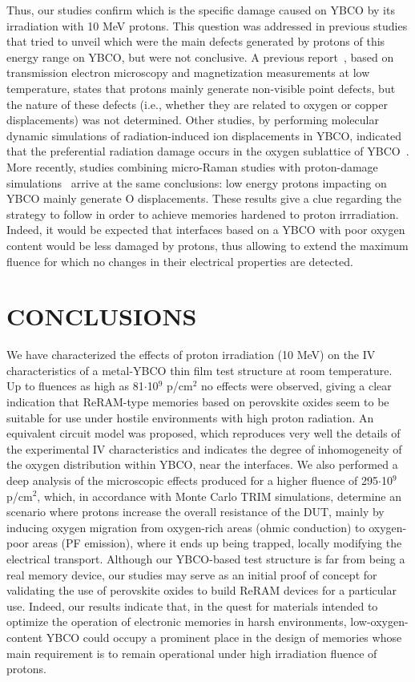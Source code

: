 \documentclass[square,aip,preprint,showkeys,superscriptaddress]{revtex4}
\begin{document}
Thus, our studies confirm which is the specific damage caused on YBCO by its irradiation with 10 MeV protons. This question was addressed in previous studies that tried to unveil which were the main defects generated by protons of this energy range on YBCO, but were not conclusive. A previous report~\cite{Kirk93}, based on transmission electron microscopy and magnetization measurements at low temperature, states that protons mainly generate non-visible point defects, but the nature of these defects (i.e., whether they are related to oxygen or copper displacements) was not determined. Other studies, by performing molecular dynamic simulations of radiation-induced ion displacements in YBCO, indicated that the preferential radiation damage occurs in the oxygen sublattice of YBCO~\cite{Cui92}. More recently, studies combining micro-Raman studies with proton-damage simulations~\cite{Li19} arrive at the same conclusions: low energy protons impacting on YBCO mainly generate O displacements. These results give a clue regarding the strategy to follow in order to achieve memories hardened to proton irrradiation. Indeed, it would be expected that interfaces based on a YBCO with poor oxygen content would be less damaged by protons, thus allowing to extend the maximum fluence for which no changes in their electrical properties are detected.



\section{CONCLUSIONS}
We have characterized the effects of proton irradiation (10 MeV) on the IV characteristics of
a metal-YBCO thin film test structure at room temperature. Up to fluences as high as 81$\cdot$10$^9$ p/cm$^2$ no effects were observed, giving a clear indication that ReRAM-type memories based on perovskite oxides seem to be suitable for use under hostile environments with high proton radiation. An equivalent circuit model was proposed, which reproduces very well the details of the experimental IV characteristics and indicates the degree of inhomogeneity of the oxygen distribution within YBCO, near the interfaces. We also performed a deep analysis of the microscopic effects produced for a higher fluence of 295$\cdot$10$^9$ p/cm$^2$, which, in accordance with Monte Carlo TRIM simulations, determine an scenario where protons increase the overall resistance of the DUT, mainly by inducing oxygen migration from oxygen-rich areas (ohmic conduction) to oxygen-poor areas (PF emission), where it ends up being trapped, locally modifying the electrical transport. Although our YBCO-based test structure is far from being a real memory device, our studies may serve as an initial proof of concept for validating the use of perovskite oxides to build ReRAM devices for a particular use. Indeed, our results indicate that, in the quest for materials intended to optimize the operation of electronic memories in harsh environments,  low-oxygen-content YBCO could occupy a prominent place in the design of memories whose main requirement is to remain operational under high irradiation fluence of protons.
\end{document}

